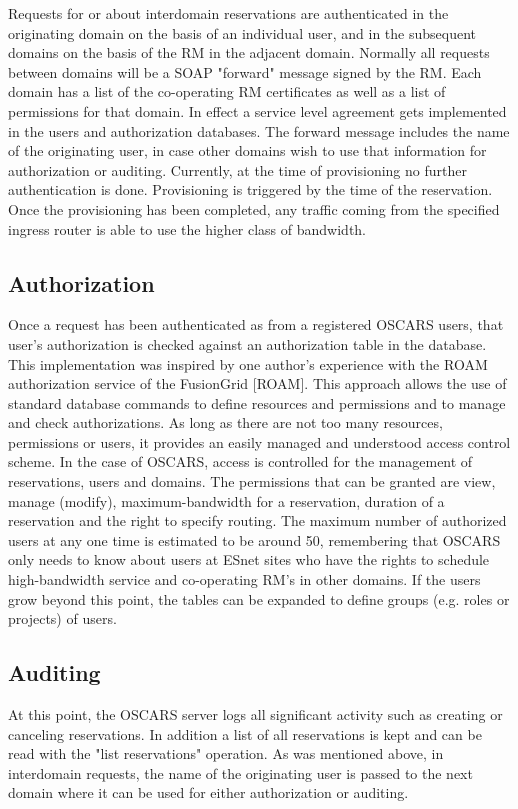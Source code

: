 \documentclass[conference]{IEEEtran}
\begin{document}
Requests for or about interdomain
reservations are authenticated in the originating domain on the basis
of an individual user, and in the subsequent domains on the basis of
the RM in the adjacent domain. Normally all requests
between domains will be a SOAP "forward"  message
signed by the RM. Each domain has a list of the
co-operating RM certificates as well as a list of
permissions for that domain. In effect a service level agreement gets
implemented in the users and authorization databases. The forward
message includes the name of the originating user, in case other
domains wish to use that information for authorization or auditing.
Currently, at the time of provisioning no further authentication is
done. Provisioning is triggered by the time of the reservation. Once
the provisioning has been completed, any traffic coming from the
specified ingress router is able to use the higher class of bandwidth.

\subsection{Authorization}
Once a request has been authenticated as from a registered OSCARS
users, that user's authorization is checked against an authorization
table in the database. This implementation was inspired by one
author's experience with the ROAM authorization service of the
FusionGrid [ROAM]. This approach allows the use of standard database
commands to define resources and permissions and to manage and check
authorizations. As long as there are not too many resources,
permissions or users, it provides an easily managed and understood
access control scheme. In the case of OSCARS,  access is controlled for 
the management of reservations, users and domains. The permissions that can
be granted are view, manage (modify), maximum-bandwidth for a
reservation, duration of a reservation and the right to specify
routing.  The maximum number of authorized users at any one time is estimated 
to be around 50, remembering that OSCARS only needs to know
about users at ESnet sites who have the rights to schedule
high-bandwidth service and co-operating RM's in other
domains. If the users grow beyond this point, the tables can be
expanded to define groups (e.g. roles or projects) of users.

\subsection{Auditing}
At this point, the OSCARS server logs all significant activity such as
creating or canceling reservations. In addition a list of all
reservations is kept and can be read with the "list reservations"
operation. As was mentioned above, in interdomain requests, the name
of the originating user is passed to the next domain where it can be
used for either authorization or auditing.
\end{document}
